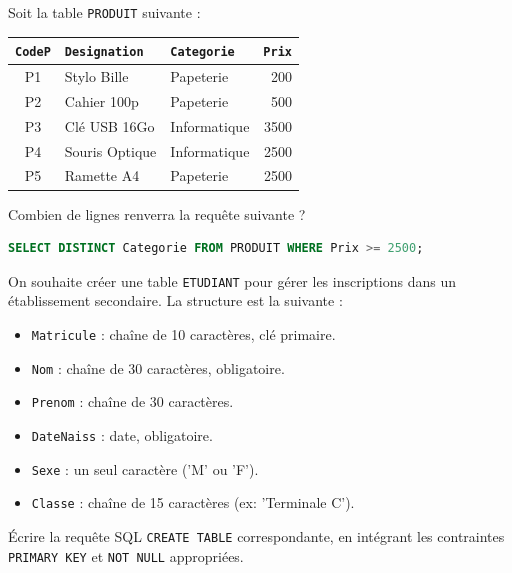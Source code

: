 \documentclass[11pt]{article}
\newcounter{popsec}
\newcounter{popsub}
\newcommand{\courssub}[1]{%
  \stepcounter{popsub}%
  \par\vspace{9pt}\noindent{\popxbold\fontsize{11.5}{13}\selectfont\color{popink}{\color{poporange}\thepopsec.\thepopsub}\hspace{6pt}#1}\par\nopagebreak\vspace{4pt}
}
\begin{document}
\begin{exercice}
Soit la table \texttt{PRODUIT} suivante :
\begin{center}
\begin{tabular}{|c|l|l|r|}
\hline
\texttt{CodeP} & \texttt{Designation} & \texttt{Categorie} & \texttt{Prix} \\ \hline
P1 & Stylo Bille & Papeterie & 200 \\
P2 & Cahier 100p & Papeterie & 500 \\
P3 & Clé USB 16Go & Informatique & 3500 \\
P4 & Souris Optique & Informatique & 2500 \\
P5 & Ramette A4 & Papeterie & 2500 \\
\hline
\end{tabular}
\end{center}
Combien de lignes renverra la requête suivante ?
\begin{lstlisting}[language=SQL]
SELECT DISTINCT Categorie FROM PRODUIT WHERE Prix >= 2500;
\end{lstlisting}
\end{exercice}

\courssub{Je m'entraîne}

\begin{exercice}
On souhaite créer une table \texttt{ETUDIANT} pour gérer les inscriptions dans un établissement secondaire. La structure est la suivante :
\begin{itemize}
    \item \texttt{Matricule} : chaîne de 10 caractères, clé primaire.
    \item \texttt{Nom} : chaîne de 30 caractères, obligatoire.
    \item \texttt{Prenom} : chaîne de 30 caractères.
    \item \texttt{DateNaiss} : date, obligatoire.
    \item \texttt{Sexe} : un seul caractère ('M' ou 'F').
    \item \texttt{Classe} : chaîne de 15 caractères (ex: 'Terminale C').
\end{itemize}
Écrire la requête SQL \texttt{CREATE TABLE} correspondante, en intégrant les contraintes \texttt{PRIMARY KEY} et \texttt{NOT NULL} appropriées.
\end{exercice}
\end{document}
